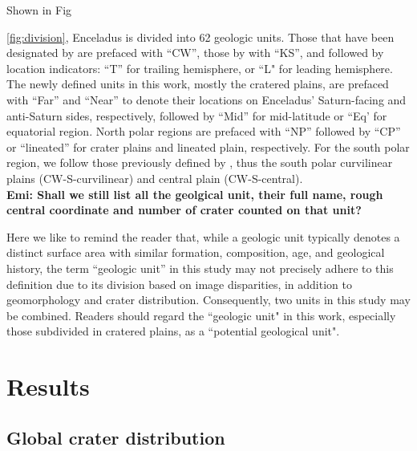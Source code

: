 \documentclass[preprint,12pt,3p,times,authoryear]{elsarticle}
\begin{document}
Shown in Fig~{\ref{fig:division}, Enceladus is divided into 62 geologic units. Those that have been designated by \citet{CrowWillard2015} are prefaced with ``CW'', those by \citet{Kirchoff2009} with ``KS'', and followed by location indicators: ``T'' for trailing hemisphere, or ``L" for leading hemisphere. The newly defined units in this work, mostly the cratered plains, are prefaced with ``Far'' and ``Near'' to denote their locations on Enceladus' Saturn-facing and anti-Saturn sides, respectively, followed by ``Mid'' for mid-latitude or ``Eq’ for equatorial region. North polar regions are prefaced with ``NP'' followed by ``CP'' or ``lineated'' for crater plains and lineated plain, respectively. For the south polar region, we follow those previously defined by \citet{CrowWillard2015}, thus the south polar curvilinear plains (CW-S-curvilinear) and central plain (CW-S-central). \\
\textbf{Emi: Shall we still list all the geolgical unit, their full name, rough central coordinate and number of crater counted on that unit?}

Here we like to remind the reader that, while a geologic unit typically denotes a distinct surface area with similar formation, composition, age, and geological history, the term ``geologic unit'' in this study may not precisely adhere to this definition due to its division based on image disparities, in addition to geomorphology and crater distribution. Consequently, two units in this study may be combined. Readers should regard the ``geologic unit" in this work, especially those subdivided in cratered plains, as a ``potential geological unit".


\section{Results}

\subsection{Global crater distribution}
\label{subsec:crater_dist}

}
\end{document}
